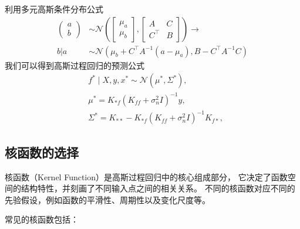利用多元高斯条件分布公式
\begin{equation}
    \begin{aligned}
        \begin{pmatrix}
            a \\ b
        \end{pmatrix} & \sim \mathcal N
        \left( 
            \begin{bmatrix}
            \mu_a \\ \mu_b
            \end{bmatrix}, \begin{bmatrix}
                A & C \\
                C^\top & B
            \end{bmatrix}
        \right) \rightarrow \\
        b | a & \sim \mathcal N (\mu_b + C^\top A^{-1} (a - \mu_a), B - C^\top A^{-1} C)
    \end{aligned}
\end{equation}
我们可以得到高斯过程回归的预测公式
\begin{equation}
\label{equ:gpr_intro2}
\begin{aligned}
    & f^* \mid X, y, x^* \sim \mathcal{N}(\mu^*, \Sigma^*) , \\
    & \mu^* = K_{*f} (K_{ff} + \sigma_n^2 I)^{-1} y, \\
    & \Sigma^* = K_{**} - K_{*f} (K_{ff} + \sigma_n^2 I)^{-1} K_{f*} ,
\end{aligned}
\end{equation}

\subsection{核函数的选择}

核函数（Kernel Function）是高斯过程回归中的核心组成部分，
它决定了函数空间的结构特性，并刻画了不同输入点之间的相关关系。
不同的核函数对应不同的先验假设，例如函数的平滑性、周期性以及变化尺度等。

常见的核函数包括：

